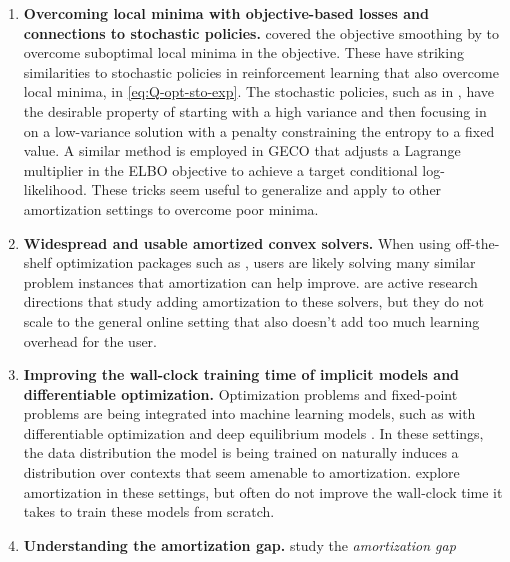 \begin{enumerate}
\item \textbf{Overcoming local minima with objective-based losses
    and connections to stochastic policies.}
   covered the objective smoothing by
  \citet{metz2019understanding,merchant2021learn2hop}
  to overcome suboptimal local minima in the objective.
  These have striking similarities to stochastic policies
  in reinforcement learning that also overcome local
  minima, \eg in \cref{eq:Q-opt-sto-exp}.
  The stochastic policies, such as in \citet{haarnoja2018soft},
  have the desirable property of starting with a high variance
  and then focusing in on a low-variance solution with a
  penalty constraining the entropy to a fixed value.
  A similar method is employed in GECO \citep{rezende2018taming}
  that adjusts a Lagrange multiplier in the ELBO objective
  to achieve a target conditional log-likelihood.
  These tricks seem useful to generalize and apply to
  other amortization settings to overcome poor minima.
\item \textbf{Widespread and usable amortized convex solvers.}
  When using off-the-shelf optimization packages such as
  \citet{diamond2016cvxpy,o2016conic,stellato2018osqp},
  users are likely solving many similar problem instances
  that amortization can help improve.
  \citet{venkataraman2021neural,ichnowski2021accelerating}
  are active research directions that study adding
  amortization to these solvers, but they do not scale
  to the general online setting that also doesn't
  add too much learning overhead for the user.
\item \textbf{Improving the wall-clock training time
    of implicit models and differentiable optimization.}
  Optimization problems and fixed-point problems
  are being integrated into machine learning models,
  such as with differentiable optimization
  \citep{domke2012generic,gould2016differentiating,amos2017optnet,amos2019differentiable,agrawal2019differentiable,lee2019meta}
  and deep equilibrium models
  \citep{bai2019deep,bai2020multiscale}.
  In these settings, the data distribution the model
  is being trained on naturally induces a distribution over
  contexts that seem amenable to amortization.
  \citet{venkataraman2021neural,bai2022neural}
  explore amortization in these settings, but often do not
  improve the wall-clock time it takes to train these models
  from scratch.
\item \textbf{Understanding the amortization gap.}
  \citet{cremer2018inference} study the \emph{amortization gap}

\end{enumerate}
